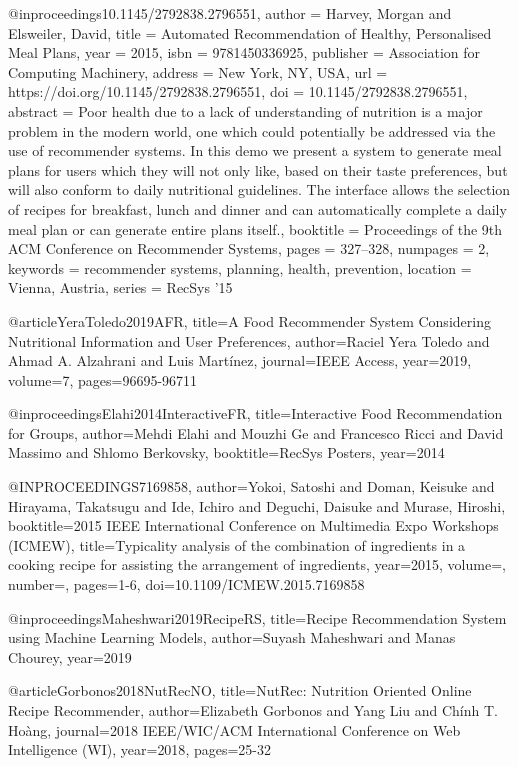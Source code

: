 @inproceedings{10.1145/2792838.2796551,
author = {Harvey, Morgan and Elsweiler, David},
title = {Automated Recommendation of Healthy, Personalised Meal Plans},
year = {2015},
isbn = {9781450336925},
publisher = {Association for Computing Machinery},
address = {New York, NY, USA},
url = {https://doi.org/10.1145/2792838.2796551},
doi = {10.1145/2792838.2796551},
abstract = {Poor health due to a lack of understanding of nutrition is a major problem in the modern world, one which could potentially be addressed via the use of recommender systems. In this demo we present a system to generate meal plans for users which they will not only like, based on their taste preferences, but will also conform to daily nutritional guidelines. The interface allows the selection of recipes for breakfast, lunch and dinner and can automatically complete a daily meal plan or can generate entire plans itself.},
booktitle = {Proceedings of the 9th ACM Conference on Recommender Systems},
pages = {327–328},
numpages = {2},
keywords = {recommender systems, planning, health, prevention},
location = {Vienna, Austria},
series = {RecSys '15}
}

@article{YeraToledo2019AFR,
  title={A Food Recommender System Considering Nutritional Information and User Preferences},
  author={Raciel Yera Toledo and Ahmad A. Alzahrani and Luis Mart{\'i}nez},
  journal={IEEE Access},
  year={2019},
  volume={7},
  pages={96695-96711}
}

@inproceedings{Elahi2014InteractiveFR,
  title={Interactive Food Recommendation for Groups},
  author={Mehdi Elahi and Mouzhi Ge and Francesco Ricci and David Massimo and Shlomo Berkovsky},
  booktitle={RecSys Posters},
  year={2014}
}

@INPROCEEDINGS{7169858,  author={Yokoi, Satoshi and Doman, Keisuke and Hirayama, Takatsugu and Ide, Ichiro and Deguchi, Daisuke and Murase, Hiroshi},  booktitle={2015 IEEE International Conference on Multimedia   Expo Workshops (ICMEW)},   title={Typicality analysis of the combination of ingredients in a cooking recipe for assisting the arrangement of ingredients},   year={2015},  volume={},  number={},  pages={1-6},  doi={10.1109/ICMEW.2015.7169858}}

@inproceedings{Maheshwari2019RecipeRS,
  title={Recipe Recommendation System using Machine Learning Models},
  author={Suyash Maheshwari and Manas Chourey},
  year={2019}
}


@article{Gorbonos2018NutRecNO,
  title={NutRec: Nutrition Oriented Online Recipe Recommender},
  author={Elizabeth Gorbonos and Yang Liu and Ch{\'i}nh T. Ho{\`a}ng},
  journal={2018 IEEE/WIC/ACM International Conference on Web Intelligence (WI)},
  year={2018},
  pages={25-32}
}

